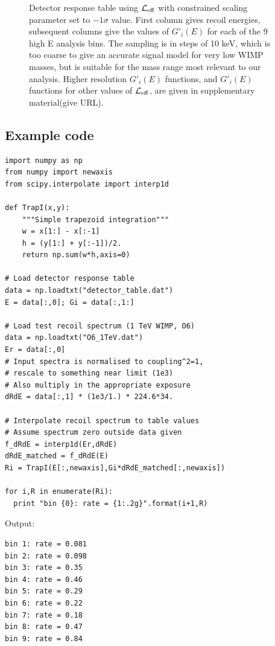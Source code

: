 \begin{figure}
{

  \lstset{tabsize=4,basicstyle=\tiny\ttfamily,columns=flexible,emptylines=10000}
  
}
\caption{Detector response table using $\mathcal{L}_{\mathrm{eff}}$ with constrained scaling parameter set to $-1\sigma$ value. First column gives recoil energies, subsequent columns give the values of $G'_i(E)$ for each of the 9 high E analysis bins. The sampling is in steps of 10 keV, which is too coarse to give an accurate signal model for very low WIMP masses, but is suitable for the mass range most relevant to our analysis. Higher resolution $G'_i(E)$ functions, and $G'_i(E)$ functions for other values of $\mathcal{L}_{\mathrm{eff}}$, are given in supplementary material\BenComment(give URL). 
\label{tab:smeartable_highE}
}
\end{figure}  

\subsection{Example code}
\label{app:example_code}
\begin{lstlisting}
import numpy as np
from numpy import newaxis
from scipy.interpolate import interp1d

def TrapI(x,y):
    """Simple trapezoid integration"""
    w = x[1:] - x[:-1]
    h = (y[1:] + y[:-1])/2.
    return np.sum(w*h,axis=0)

# Load detector response table
data = np.loadtxt("detector_table.dat")
E = data[:,0]; Gi = data[:,1:]

# Load test recoil spectrum (1 TeV WIMP, O6)
data = np.loadtxt("O6_1TeV.dat")
Er = data[:,0]
# Input spectra is normalised to coupling^2=1,
# rescale to something near limit (1e3)
# Also multiply in the appropriate exposure
dRdE = data[:,1] * (1e3/1.) * 224.6*34.

# Interpolate recoil spectrum to table values
# Assume spectrum zero outside data given
f_dRdE = interp1d(Er,dRdE)
dRdE_matched = f_dRdE(E)
Ri = TrapI(E[:,newaxis],Gi*dRdE_matched[:,newaxis])

for i,R in enumerate(Ri):
  print "bin {0}: rate = {1:.2g}".format(i+1,R)
\end{lstlisting}

Output:

\begin{lstlisting}
bin 1: rate = 0.081
bin 2: rate = 0.098
bin 3: rate = 0.35
bin 4: rate = 0.46
bin 5: rate = 0.29
bin 6: rate = 0.22
bin 7: rate = 0.18
bin 8: rate = 0.47
bin 9: rate = 0.84
\end{lstlisting}

\vfill

